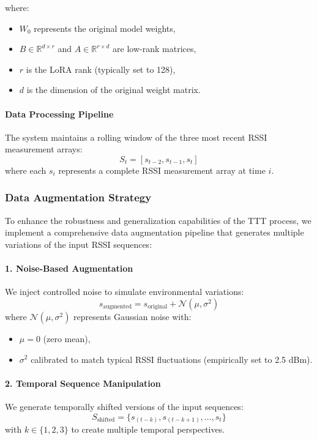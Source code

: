 \documentclass[12pt]{article}
\begin{document}
where:
\begin{itemize}
    \item \( W_0 \) represents the original model weights,
    \item \( B \in \mathbb{R}^{d \times r} \) and \( A \in \mathbb{R}^{r \times d} \) are low-rank matrices,
    \item \( r \) is the LoRA rank (typically set to 128),
    \item \( d \) is the dimension of the original weight matrix.
\end{itemize}

\paragraph{Data Processing Pipeline}

The system maintains a rolling window of the three most recent RSSI measurement arrays:
\[
S_t = [s_{t-2}, s_{t-1}, s_t]
\]
where each \( s_i \) represents a complete RSSI measurement array at time \( i \).

\subsubsection{Data Augmentation Strategy}

To enhance the robustness and generalization capabilities of the TTT process, we implement a comprehensive data augmentation pipeline that generates multiple variations of the input RSSI sequences:

\paragraph{1. Noise-Based Augmentation}
We inject controlled noise to simulate environmental variations:
\[
s_{\text{augmented}} = s_{\text{original}} + \mathcal{N}(\mu, \sigma^2)
\]
where \( \mathcal{N}(\mu, \sigma^2) \) represents Gaussian noise with:
\begin{itemize}
    \item \( \mu = 0 \) (zero mean),
    \item \( \sigma^2 \) calibrated to match typical RSSI fluctuations (empirically set to 2.5 dBm).
\end{itemize}

\paragraph{2. Temporal Sequence Manipulation}
We generate temporally shifted versions of the input sequences:
\[
S_{\text{shifted}} = \{s_{(t-k)}, s_{(t-k+1)}, \ldots, s_t\}
\]
with \( k \in \{1, 2, 3\} \) to create multiple temporal perspectives.
\end{document}
